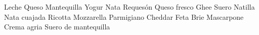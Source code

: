                  {}              {\typeNoum}     {Leche}                 {}
               {}              {\typeNoum}     {Queso}                 {}
               {}              {\typeNoum}     {Mantequilla}           {}
              {}              {\typeNoum}     {Yogur}                 {}
                {}              {\typeNoum}     {Nata}                  {}
                 {}              {\typeNoum}     {Requesón}              {}
       {}              {\typeNoum}     {Queso fresco}          {}
                 {}              {\typeNoum}     {Ghee}                  {}
                 {}              {\typeNoum}     {Suero}                 {}
              {}              {\typeNoum}     {Natilla}               {}
        {}              {\typeNoum}     {Nata cuajada}          {}
              {}              {\typeNoum}     {Ricotta}               {}
           {}              {\typeNoum}     {Mozzarella}            {}
             {}              {\typeNoum}     {Parmigiano}            {}
              {}              {\typeNoum}     {Cheddar}               {}
                 {}              {\typeNoum}     {Feta}                  {}
                 {}              {\typeNoum}     {Brie}                  {}
           {}              {\typeNoum}     {Mascarpone}            {}
           {}              {\typeNoum}     {Crema agria}           {}
           {}              {\typeNoum}     {Suero de mantequilla}  {}
